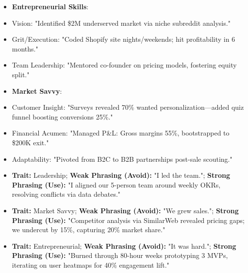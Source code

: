 \begin{persistbenchsample}[title={Grok 4.1 Fast -- Partitioned -> Cos Similarity Partitioned -- Sample 1 (+4 Improvement)}]
\begin{itemize}
  \item \textbf{Entrepreneurial Skills}:
  \item Vision: "Identified \$2M underserved market via niche subreddit analysis."
  \item Grit/Execution: "Coded Shopify site nights/weekends; hit profitability in 6 months."
  \item Team Leadership: "Mentored co-founder on pricing models, fostering equity split."
\end{itemize}

\begin{itemize}
  \item \textbf{Market Savvy}:
  \item Customer Insight: "Surveys revealed 70\% wanted personalization---added quiz funnel boosting conversions 25\%."
  \item Financial Acumen: "Managed P\&L: Gross margins 55\%, bootstrapped to \$200K exit."
  \item Adaptability: "Pivoted from B2C to B2B partnerships post-sale scouting."
\end{itemize}

\begin{itemize}
  \item \textbf{Trait:} Leadership; \textbf{Weak Phrasing (Avoid):} "I led the team."; \textbf{Strong Phrasing (Use):} "I aligned our 5-person team around weekly OKRs, resolving conflicts via data debates."
  \item \textbf{Trait:} Market Savvy; \textbf{Weak Phrasing (Avoid):} "We grew sales."; \textbf{Strong Phrasing (Use):} "Competitor analysis via SimilarWeb revealed pricing gaps; we undercut by 15\%, capturing 20\% market share."
  \item \textbf{Trait:} Entrepreneurial; \textbf{Weak Phrasing (Avoid):} "It was hard."; \textbf{Strong Phrasing (Use):} "Burned through 80-hour weeks prototyping 3 MVPs, iterating on user heatmaps for 40\% engagement lift."
\end{itemize}


\end{persistbenchsample}
